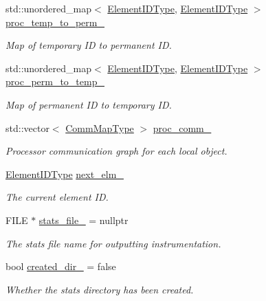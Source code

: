 \begin{DoxyCompactItemize}
std\+::unordered\+\_\+map$<$ \hyperlink{namespacevt_1_1vrt_1_1collection_1_1balance_a14c8d2c972f2913aa3f1636e5be0a120}{Element\+I\+D\+Type}, \hyperlink{namespacevt_1_1vrt_1_1collection_1_1balance_a14c8d2c972f2913aa3f1636e5be0a120}{Element\+I\+D\+Type} $>$ \hyperlink{structvt_1_1vrt_1_1collection_1_1balance_1_1_proc_stats_ac1df7dec2dc78042a582c5b86a4d517b}{proc\+\_\+temp\+\_\+to\+\_\+perm\+\_\+}
\begin{DoxyCompactList}\small\item\em Map of temporary ID to permanent ID. \end{DoxyCompactList}\item 
std\+::unordered\+\_\+map$<$ \hyperlink{namespacevt_1_1vrt_1_1collection_1_1balance_a14c8d2c972f2913aa3f1636e5be0a120}{Element\+I\+D\+Type}, \hyperlink{namespacevt_1_1vrt_1_1collection_1_1balance_a14c8d2c972f2913aa3f1636e5be0a120}{Element\+I\+D\+Type} $>$ \hyperlink{structvt_1_1vrt_1_1collection_1_1balance_1_1_proc_stats_a2812dc9eb7a995c67f9fade6d8b58799}{proc\+\_\+perm\+\_\+to\+\_\+temp\+\_\+}
\begin{DoxyCompactList}\small\item\em Map of permanent ID to temporary ID. \end{DoxyCompactList}\item 
std\+::vector$<$ \hyperlink{namespacevt_1_1vrt_1_1collection_1_1balance_aa50d4cbbfa3c643e7303fc6e08f411fb}{Comm\+Map\+Type} $>$ \hyperlink{structvt_1_1vrt_1_1collection_1_1balance_1_1_proc_stats_a528f63fad3b42c387d0b38ba3c0eea11}{proc\+\_\+comm\+\_\+}
\begin{DoxyCompactList}\small\item\em Processor communication graph for each local object. \end{DoxyCompactList}\item 
\hyperlink{namespacevt_1_1vrt_1_1collection_1_1balance_a14c8d2c972f2913aa3f1636e5be0a120}{Element\+I\+D\+Type} \hyperlink{structvt_1_1vrt_1_1collection_1_1balance_1_1_proc_stats_a863634793fedcfefd22677b4ee943f8f}{next\+\_\+elm\+\_\+}
\begin{DoxyCompactList}\small\item\em The current element ID. \end{DoxyCompactList}\item 
F\+I\+LE $\ast$ \hyperlink{structvt_1_1vrt_1_1collection_1_1balance_1_1_proc_stats_a7c1a0cd0d083053cc4670873bc4f6ef1}{stats\+\_\+file\+\_\+} = nullptr
\begin{DoxyCompactList}\small\item\em The stats file name for outputting instrumentation. \end{DoxyCompactList}\item 
bool \hyperlink{structvt_1_1vrt_1_1collection_1_1balance_1_1_proc_stats_a44e4994b863721b1a20bcd2333a1966b}{created\+\_\+dir\+\_\+} = false
\begin{DoxyCompactList}\small\item\em Whether the stats directory has been created. \end{DoxyCompactList}\end{DoxyCompactItemize}
